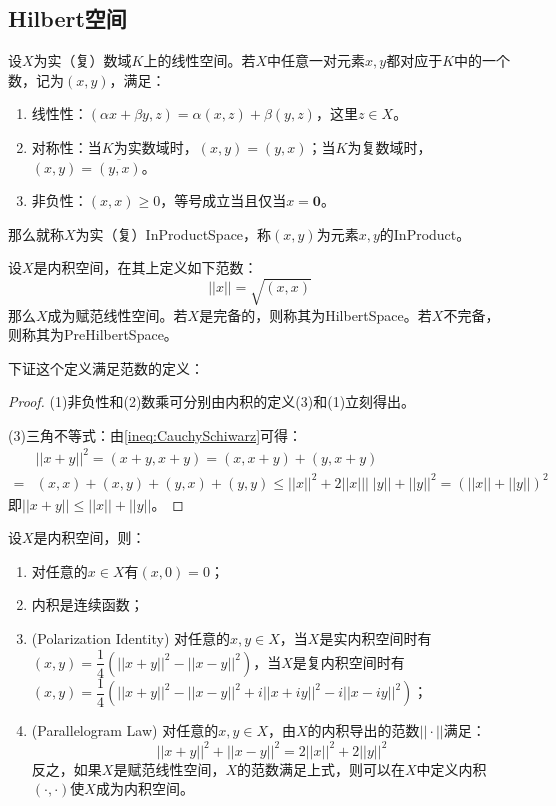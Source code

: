 \subsection{Hilbert空间}
\begin{definition}\label{def:InProductSpace}
	设$X$为实（复）数域$K$上的线性空间。若$X$中任意一对元素$x,y$都对应于$K$中的一个数，记为$(x,y)$，满足：
	\begin{enumerate}
		\item 线性性：$(\alpha x+\beta y,z)=\alpha(x,z)+\beta(y,z)$，这里$z\in X$。
		\item 对称性：当$K$为实数域时，$(x,y)=(y,x)$；当$K$为复数域时，$(x,y)=\overline{(y,x)}$。
		\item 非负性：$(x,x)\geqslant 0$，等号成立当且仅当$x=\mathbf{0}$。
	\end{enumerate}
	那么就称$X$为实（复）\gls{InProductSpace}，称$(x,y)$为元素$x,y$的\gls{InProduct}。
\end{definition}
\begin{definition}
	设$X$是内积空间，在其上定义如下范数：
	\begin{equation*}
		||x||=\sqrt{(x,x)}
	\end{equation*}
	那么$X$成为赋范线性空间。若$X$是完备的，则称其为\gls{HilbertSpace}。若$X$不完备，则称其为\gls{PreHilbertSpace}。
\end{definition}
下证这个定义满足范数的定义：
\begin{proof}
	(1)非负性和(2)数乘可分别由内积的定义(3)和(1)立刻得出。\par
	(3)三角不等式：由\cref{ineq:CauchySchiwarz}可得：
	\begin{align*}
		&||x+y||^2=(x+y,x+y)=(x,x+y)+(y,x+y) \\
		=&(x,x)+(x,y)+(y,x)+(y,y)\leqslant||x||^2+2||x|||\;|y||+||y||^2=(||x||+||y||)^2
	\end{align*}
	即$||x+y||\leqslant||x||+||y||$。
\end{proof}
\begin{property}\label{prop:InnerProduct}
	设$X$是内积空间，则：
	\begin{enumerate}
		\item 对任意的$x\in X$有$(x,0)=0$；
		\item 内积是连续函数；
		\item(Polarization Identity) 对任意的$x,y\in X$，当$X$是实内积空间时有$(x,y)=\dfrac{1}{4}(||x+y||^2-||x-y||^2)$，当$X$是复内积空间时有$(x,y)=\dfrac{1}{4}(||x+y||^2-||x-y||^2+i||x+iy||^2-i||x-iy||^2)$；
		\item(Parallelogram Law) 对任意的$x,y\in X$，由$X$的内积导出的范数$||\cdot||$满足：
		\begin{equation*}
			||x+y||^2+||x-y||^2=2||x||^2+2||y||^2
		\end{equation*}
		反之，如果$X$是赋范线性空间，$X$的范数满足上式，则可以在$X$中定义内积$(\cdot,\cdot)$使$X$成为内积空间。
	\end{enumerate}
\end{property}
